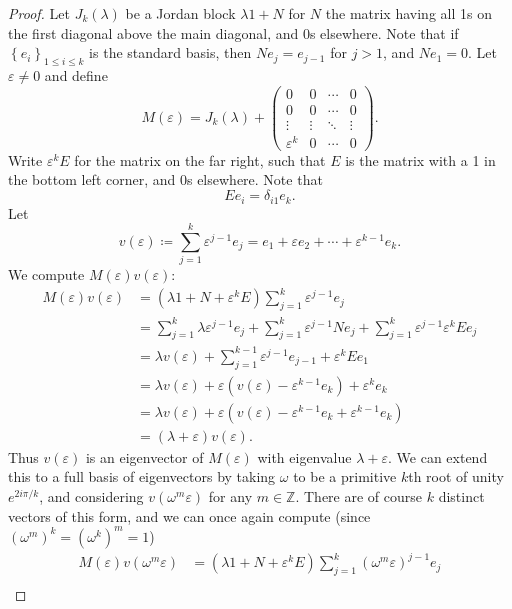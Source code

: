 \documentclass[11pt, letterpaper]{article}
\theoremstyle{plain}
\begin{document}
\begin{proof}
	Let $J_k(\lambda )$ be a Jordan block $\lambda 1+N$ for $N$ the matrix having all 1s on the first diagonal above the main diagonal, and 0s elsewhere. Note that if $\left\{ e_i \right\} _{1\leq i\leq k} $ is the standard basis, then $Ne_j=e_{j-1} $ for $j>1$, and $Ne_1=0$. Let $\varepsilon \neq 0$ and define
	\[
		M(\varepsilon)=J_k(\lambda )+\begin{pmatrix}
			0 & 0 & \cdots  & 0 \\
			0 & 0 & \cdots & 0\\
			\vdots & \vdots & \ddots & \vdots \\
			\varepsilon ^k & 0 & \cdots  & 0
		\end{pmatrix}
	.\]
	Write $\varepsilon ^kE$ for the matrix on the far right, such that $E$ is the matrix with a 1 in the bottom left corner, and 0s elsewhere. Note that
	\[
		Ee_i=\delta _{i1} e_k
	.\]
	Let
	\[
		v(\varepsilon )\coloneqq \sum_{j=1}^{k} \varepsilon ^{j-1} e_j=e_1+\varepsilon e_2 + \cdots + \varepsilon ^{k-1} e_k
	.\]
	We compute $M(\varepsilon )v(\varepsilon )$:
	\begin{align*}
		M(\varepsilon )v(\varepsilon )&=(\lambda 1+N+\varepsilon ^kE)\sum_{j=1}^{k} \varepsilon ^{j-1} e_j\\
					      &=\sum_{j=1}^{k} \lambda \varepsilon ^{j-1} e_j + \sum_{j=1}^{k} \varepsilon ^{j-1} Ne_j + \sum_{j=1}^{k} \varepsilon ^{j-1} \varepsilon ^kEe_j\\
					      &=\lambda v(\varepsilon )+\sum_{j=1}^{k-1} \varepsilon ^{j-1} e_{j-1} +\varepsilon ^{k} Ee_1\\
					      &=\lambda v(\varepsilon )+\varepsilon \left(v(\varepsilon )-\varepsilon ^{k-1} e_k\right) + \varepsilon ^ke_k\\
					      &=\lambda v(\varepsilon ) + \varepsilon \left(v(\varepsilon )-\varepsilon ^{k-1} e_k + \varepsilon ^{k-1} e_k\right)\\
					      &=(\lambda +\varepsilon )v(\varepsilon )
	.\end{align*}
	Thus $v(\varepsilon )$ is an eigenvector of $M(\varepsilon )$ with eigenvalue $\lambda +\varepsilon $. We can extend this to a full basis of eigenvectors by taking $\omega $ to be a primitive $k$th root of unity $e^{2i\pi /k} $, and considering $v(\omega^m\varepsilon )$ for any $m\in\mathbb{Z} $. There are of course $k$ distinct vectors of this form, and we can once again compute (since $(\omega ^m)^k=(\omega ^k)^m=1$)
	\begin{align*}
		M(\varepsilon )v(\omega ^m\varepsilon )&=(\lambda 1+N+\varepsilon ^kE)\sum_{j=1}^{k} (\omega ^m\varepsilon) ^{j-1} e_j\\

\end{align*}
\end{proof}
\end{document}
